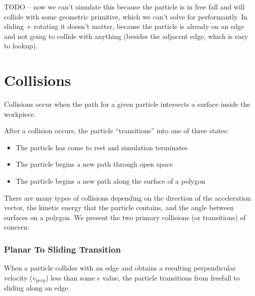 


TODO -- now we can't simulate this because the particle is in free fall and will collide with some geometric primitive, which we can't solve for performantly. In sliding + rotating it doesn't matter, because the particle is already on an edge and not going to collide with anything (besides the adjacent edge, which is easy to lookup).

	\section{Collisions}

Collisions occur when the path for a given particle intersects a surface inside the workpiece.


After a collision occurs, the particle ``transitions'' into one of three states:

\begin{itemize}
\item The particle has come to rest and simulation terminates
\item The particle begins a new path through open space
\item The particle begins a new path along the surface of a polygon
\end{itemize}

There are many types of collisions depending on the direction of the acceleration vector, the kinetic energy that the particle contains, and the angle between surfaces on a polygon. We present the two primary collisions (or transitions) of concern:

		\subsubsection{Planar To Sliding Transition}

When a particle collides with an edge and obtains a resulting perpendicular velocity ($v_{perp}$) less than some $\epsilon$ value, the particle transitions from freefall to sliding along an edge.




